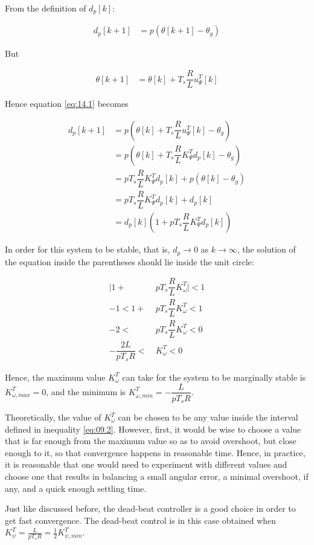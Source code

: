 From the definition of $d_p[k]$:

\begin{align}
  d_p[k+1] &= p (\theta[k+1] - \theta_g) \label{eq:14.1}
\end{align}

But

\begin{align*}
  \theta[k+1] &= \theta[k] + T_s \dfrac{R}{L} u_{\Psi}^T[k]
\end{align*}

Hence equation \ref{eq:14.1} becomes

\begin{align*}
  d_p[k+1] &= p (\theta[k] + T_s \dfrac{R}{L} u_{\Psi}^T[k] - \theta_g) \\
           &= p(\theta[k] + T_s \dfrac{R}{L} K_{\Psi}^T d_p[k] - \theta_g)  \\
           &= p T_s \dfrac{R}{L} K_{\Psi}^T d_p[k] + p (\theta[k] - \theta_g) \\
           &= p T_s \dfrac{R}{L} K_{\Psi}^T d_p[k] + d_p[k] \\
           &= d_p[k] (1 + p T_s \dfrac{R}{L} K_{\Psi}^T d_p[k])
\end{align*}

In order for this system to be stable, that is, $d_p \to 0$ as $k \to \infty$,
the solution of the equation inside the parentheses should lie inside the unit
circle:

\begin{align}
  \Big|1 + &p T_s \dfrac{R}{L} K_{\omega}^T\Big| < 1 \nonumber \\
  -1 < 1 + &p T_s \dfrac{R}{L} K_{\omega}^T < 1 \nonumber \\
  -2 < &p T_s \dfrac{R}{L} K_{\omega}^T < 0 \nonumber \\
  -\dfrac{2L}{p T_s R} <\ &K_{\omega}^T < 0 \label{eq:14.2}
\end{align}

Hence, the maximum value $K_{\omega}^T$ can take for the system to be marginally
stable is $K_{\omega,max}^T = 0$, and the minimum is
$K_{\omega,min}^T = -\dfrac{L}{p T_s R}$.

Theoretically, the value of $K_{\omega}^T$ can be chosen to be any value inside
the interval defined in inequality \ref{eq:09.2}. However, first, it would be
wise to choose a value that is far enough from the maximum value so as to avoid
overshoot, but close enough to it, so that convergence happens in reasonable
time. Hence, in practice, it is reasonable that one would need to experiment
with different values and choose one that results in balancing a small angular
error, a minimal overshoot, if any, and a quick enough settling time.

Just like discussed before, the dead-beat controller is a good choice in order to
get fast convergence. The dead-beat control is in this case obtained when
$K_\psi ^T = \frac{L}{pT_s R} = \frac{1}{2}K_{\psi,min} ^T$.
